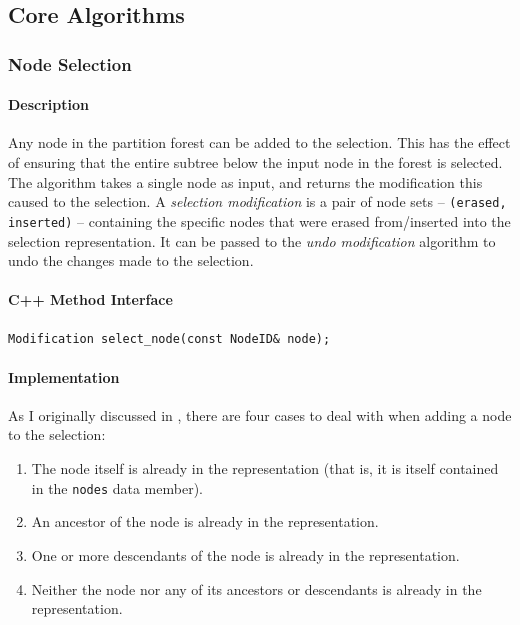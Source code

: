 \subsection{Core Algorithms}

\subsubsection{Node Selection}

\paragraph{Description}

Any node in the partition forest can be added to the selection. This has the effect of ensuring that the entire subtree below the input node in the forest is selected. The algorithm takes a single node as input, and returns the modification this caused to the selection. A \emph{selection modification} is a pair of node sets -- \texttt{(erased, inserted)} -- containing the specific nodes that were erased from/inserted into the selection representation. It can be passed to the \emph{undo modification} algorithm to undo the changes made to the selection.

\paragraph{C++ Method Interface}

\begin{lstlisting}[style=Prototype]
Modification select_node(const NodeID& node);
\end{lstlisting}

\paragraph{Implementation}

As I originally discussed in \cite{gvcispa09}, there are four cases to deal with when adding a node to the selection:

\begin{enumerate}

\item The node itself is already in the representation (that is, it is itself contained in the \texttt{nodes} data member).
\item An ancestor of the node is already in the representation.
\item One or more descendants of the node is already in the representation.
\item Neither the node nor any of its ancestors or descendants is already in the representation.

\end{enumerate}

